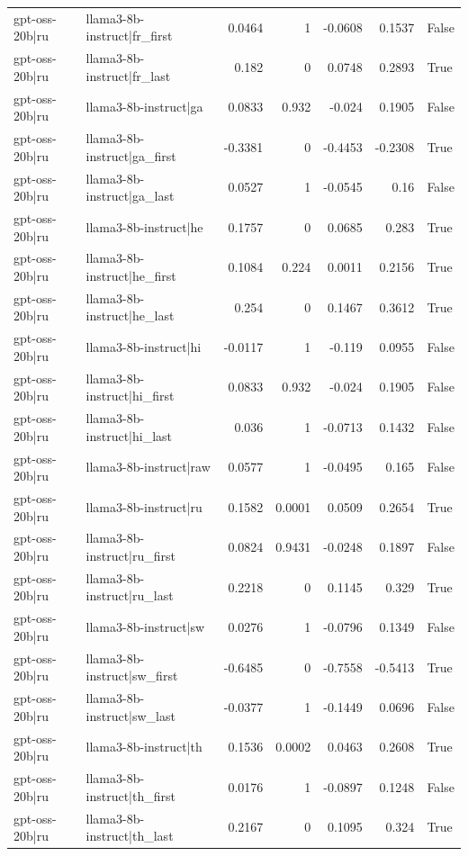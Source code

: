 \begin{table}
\begin{tabular}{l l r r r r l}
gpt-oss-20b|ru & llama3-8b-instruct|fr_first & 0.0464 & 1 & -0.0608 & 0.1537 & False \\
gpt-oss-20b|ru & llama3-8b-instruct|fr_last & 0.182 & 0 & 0.0748 & 0.2893 & True \\
gpt-oss-20b|ru & llama3-8b-instruct|ga & 0.0833 & 0.932 & -0.024 & 0.1905 & False \\
gpt-oss-20b|ru & llama3-8b-instruct|ga_first & -0.3381 & 0 & -0.4453 & -0.2308 & True \\
gpt-oss-20b|ru & llama3-8b-instruct|ga_last & 0.0527 & 1 & -0.0545 & 0.16 & False \\
gpt-oss-20b|ru & llama3-8b-instruct|he & 0.1757 & 0 & 0.0685 & 0.283 & True \\
gpt-oss-20b|ru & llama3-8b-instruct|he_first & 0.1084 & 0.224 & 0.0011 & 0.2156 & True \\
gpt-oss-20b|ru & llama3-8b-instruct|he_last & 0.254 & 0 & 0.1467 & 0.3612 & True \\
gpt-oss-20b|ru & llama3-8b-instruct|hi & -0.0117 & 1 & -0.119 & 0.0955 & False \\
gpt-oss-20b|ru & llama3-8b-instruct|hi_first & 0.0833 & 0.932 & -0.024 & 0.1905 & False \\
gpt-oss-20b|ru & llama3-8b-instruct|hi_last & 0.036 & 1 & -0.0713 & 0.1432 & False \\
gpt-oss-20b|ru & llama3-8b-instruct|raw & 0.0577 & 1 & -0.0495 & 0.165 & False \\
gpt-oss-20b|ru & llama3-8b-instruct|ru & 0.1582 & 0.0001 & 0.0509 & 0.2654 & True \\
gpt-oss-20b|ru & llama3-8b-instruct|ru_first & 0.0824 & 0.9431 & -0.0248 & 0.1897 & False \\
gpt-oss-20b|ru & llama3-8b-instruct|ru_last & 0.2218 & 0 & 0.1145 & 0.329 & True \\
gpt-oss-20b|ru & llama3-8b-instruct|sw & 0.0276 & 1 & -0.0796 & 0.1349 & False \\
gpt-oss-20b|ru & llama3-8b-instruct|sw_first & -0.6485 & 0 & -0.7558 & -0.5413 & True \\
gpt-oss-20b|ru & llama3-8b-instruct|sw_last & -0.0377 & 1 & -0.1449 & 0.0696 & False \\
gpt-oss-20b|ru & llama3-8b-instruct|th & 0.1536 & 0.0002 & 0.0463 & 0.2608 & True \\
gpt-oss-20b|ru & llama3-8b-instruct|th_first & 0.0176 & 1 & -0.0897 & 0.1248 & False \\
gpt-oss-20b|ru & llama3-8b-instruct|th_last & 0.2167 & 0 & 0.1095 & 0.324 & True \\

\end{tabular}
\end{table}
